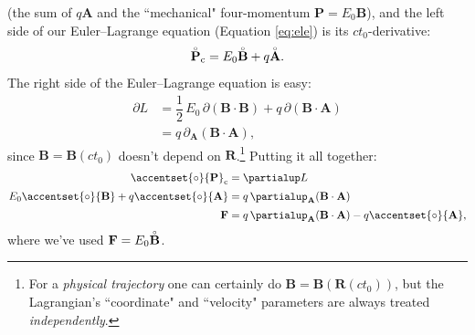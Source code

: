 \documentclass[12pt]{article}
\renewcommand{\mathring}[1]{\accentset{\circ}{#1}}
\renewcommand{\vv}[1]{\mathbf{#1}}
\begin{document}
(the sum of $q \vv A$ and the ``mechanical" four-momentum $\vv P = E_0 \vv B$), and the left side of our Euler--Lagrange equation (Equation \ref{eq:ele}) is its $ct_0$-derivative:
\begin{equation*}
\mathring{\vv P}_\textrm{c}  =  E_0 \mathring{\vv B} + q \mathring{\vv A} .
\end{equation*}
The right side of the Euler--Lagrange equation is easy:
\begin{equation*}
\begin{split}
\partialup L &= \dfrac{1}{2} \, E_0 \, \partialup (\vv B \cdot \vv B) + q \, \partialup (\vv B \cdot \vv A) \\[2pt]
&= q \, \partialup_{\vv A} (\vv B \cdot \vv A),
\end{split}
\end{equation*}
since $\vv B = \vv B(ct_0)$ doesn't depend on $\vv R$.\footnote{For a \emph{physical trajectory} one can certainly do $\vv B = \vv B (\vv R (ct_0))$, but the Lagrangian's ``coordinate" and ``velocity" parameters are always treated \emph{independently}.} Putting it all together:
\begin{equation}\label{eq:emeom}
\begin{split}
\mathring{\vv P}_\textrm{c} &= \partialup L \\[2pt]
E_0 \mathring{\vv B} + q \mathring{\vv A} &= q \, \partialup_{\vv A} (\vv B \cdot \vv A) \\[2pt]
\vv F &= q \, \partialup_{\vv A} (\vv B \cdot \vv A) - q \mathring{\vv A} ,
\end{split}
\end{equation}
where we've used $\vv F = E_0 \mathring{\vv B}$.
\end{document}
